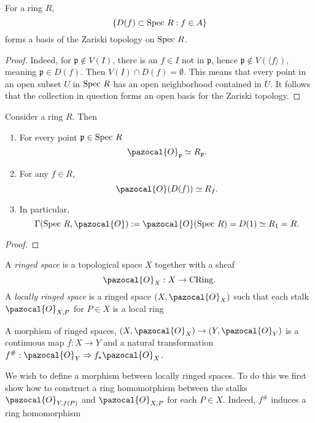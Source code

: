 \begin{lemma}
    For a ring $R$,
    $$
        \{D(f)\subset \mathrm{Spec}\ R : f\in A\}
    $$
    forms a basis of the Zariski topology on $\mathrm{Spec}\ R$.
\end{lemma}
\begin{proof}
    Indeed, for $\mathfrak{p}\notin V(I)$, there is an $f\in I$ not in $\mathfrak{p}$, hence $\mathfrak{p}\notin V(\langle f\rangle)$, meaning $\mathfrak{p}\in D(f)$. Then $V(I)\cap D(f) = \emptyset$. This means that every point in an open subset $U$ in $\mathrm{Spec} \ R$ has an open neighborhood contained in $U$. It follows that the collection in question forms an open basis for the Zariski topology. 
\end{proof}
\begin{lemma}
    Consider a ring $R$. Then 
    \begin{enumerate}
        \item For every point $\mathfrak{p}\in \Spec\ R$
        $$
            \pazocal{O}_\mathfrak{p} \simeq R_\mathfrak{p}.
        $$
        \item For any $f\in R$,
        $$
            \pazocal{O}(D(f)) \simeq R_f.
        $$
        \item In particular,
        $$
            \Gamma(\Spec\ R,\pazocal{O}):= \pazocal{O}(\Spec\ R) = D(1) \simeq R_1 = R.
        $$
    \end{enumerate}    
\end{lemma}
\begin{proof}
    
\end{proof}
\begin{definition}
    A \emph{ringed space} is a topological space $X$ together with a sheaf 
    $$
        \pazocal{O}_X : X \rightarrow \mathrm{CRing}.
    $$
    A \emph{locally ringed space} is a ringed space $(X,\pazocal{O}_X)$ such that each stalk $\pazocal{O}_{X,P}$ for $P\in X$ is a local ring
\end{definition}
\begin{definition}
    A morphism of ringed spaces, $(X,\pazocal{O}_X)\rightarrow (Y,\pazocal{O}_Y)$ is a continuous map $f: X\rightarrow Y$ and a natural transformation $f^\# : \pazocal{O}_Y \Rightarrow f_\star \pazocal{O}_X$.
\end{definition}
We wish to define a morphism between locally ringed spaces. To do this we first show how to construct a ring homomorphism between the stalks $\pazocal{O}_{Y,f(P)}$ and $\pazocal{O}_{X,P}$ for each $P\in X$. Indeed, $f^\#$ induces a ring homomorphism 
